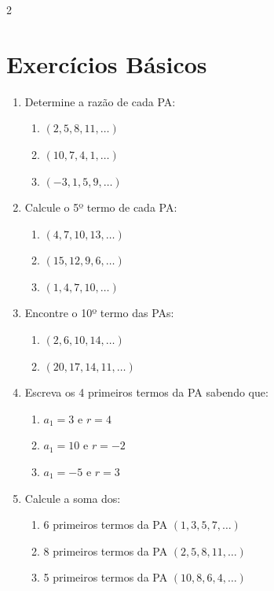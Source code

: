 \documentclass[11pt]{article}
\begin{document}
\begin{multicols}{2}

\section*{Exercícios Básicos}

\begin{enumerate}[leftmargin=*]

\item Determine a razão de cada PA:
\begin{enumerate}[label=\alph*)]
\item $(2, 5, 8, 11, \ldots)$
\item $(10, 7, 4, 1, \ldots)$
\item $(-3, 1, 5, 9, \ldots)$
\end{enumerate}

\item Calcule o 5º termo de cada PA:
\begin{enumerate}[label=\alph*)]
\item $(4, 7, 10, 13, \ldots)$
\item $(15, 12, 9, 6, \ldots)$
\item $(1, 4, 7, 10, \ldots)$
\end{enumerate}

\item Encontre o 10º termo das PAs:
\begin{enumerate}[label=\alph*)]
\item $(2, 6, 10, 14, \ldots)$
\item $(20, 17, 14, 11, \ldots)$
\end{enumerate}

\item Escreva os 4 primeiros termos da PA sabendo que:
\begin{enumerate}[label=\alph*)]
\item $a_1 = 3$ e $r = 4$
\item $a_1 = 10$ e $r = -2$
\item $a_1 = -5$ e $r = 3$
\end{enumerate}

\item Calcule a soma dos:
\begin{enumerate}[label=\alph*)]
\item 6 primeiros termos da PA $(1, 3, 5, 7, \ldots)$
\item 8 primeiros termos da PA $(2, 5, 8, 11, \ldots)$
\item 5 primeiros termos da PA $(10, 8, 6, 4, \ldots)$
\end{enumerate}


\end{enumerate}
\end{multicols}
\end{document}
